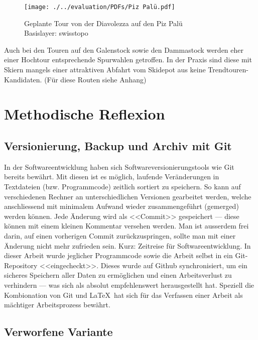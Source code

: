 \begin{figure}[h]
  \centering
  \texttt{[image: ./../evaluation/PDFs/Piz Palü.pdf]}
  \caption{Geplante Tour von der Diavolezza auf den Piz Palü\\Basislayer: swisstopo}\label{fig:pizpalu}
\end{figure}

Auch bei den Touren auf den Galenstock sowie den Dammastock werden eher einer Hochtour entsprechende Spurwahlen getroffen. In der Praxis sind diese mit Skiern mangels einer attraktiven Abfahrt vom Skidepot aus keine Trendtouren-Kandidaten. (Für diese Routen siehe Anhang)
\clearpage
\section{Methodische Reflexion}
\subsection{Versionierung, Backup und Archiv mit Git}

In der Softwareentwicklung haben sich Softwareversionierungstools wie Git bereits bewährt. Mit diesen ist es möglich, laufende Veränderungen in Textdateien (bzw. Programmcode) zeitlich sortiert zu speichern. So kann auf verschiedenen Rechner an unterschiedlichen Versionen gearbeitet werden, welche anschliessend mit minimalem Aufwand wieder zusammengeführt (gemerged) werden können. Jede Änderung wird als <<Commit>> gespeichert --- diese können mit einem kleinen Kommentar versehen werden. Man ist ausserdem frei darin, auf einen vorherigen Commit zurückzuspringen, sollte man mit einer Änderung nicht mehr zufrieden sein. Kurz: Zeitreise für Softwareentwicklung. 
In dieser Arbeit wurde jeglicher Programmcode sowie die Arbeit selbst in ein Git-Repository <<eingecheckt>>. Dieses wurde auf Github synchronisiert, um ein sicheres Speichern aller Daten zu ermöglichen und einen Arbeitsverlust zu verhindern --- was sich als absolut empfehlenswert herausgestellt hat. Speziell die Kombionation von Git und \LaTeX\ hat sich für das Verfassen einer Arbeit als mächtiger Arbeitsprozess bewährt.

\subsection{Verworfene Variante}

